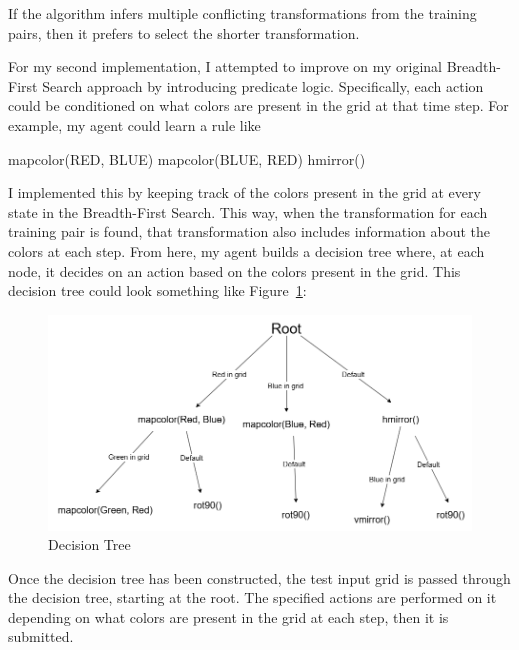 \documentclass[letterpaper]{article} %
\begin{document}
\bigskip

If the algorithm infers multiple conflicting transformations from the training pairs, then it prefers to select the shorter transformation.

\bigskip\bigskip

For my second implementation, I attempted to improve on my original Breadth-First Search approach by introducing predicate logic. Specifically, each action could be conditioned on what colors are present in the grid at that time step. For example, my agent could learn a rule like


\begin{algorithmic}
        \STATE mapcolor(RED, BLUE)
        \STATE mapcolor(BLUE, RED)
    \ELSE
        \STATE hmirror()
    \ENDIF
\end{algorithmic}

\bigskip

I implemented this by keeping track of the colors present in the grid at every state in the Breadth-First Search. This way, when the transformation for each training pair is found, that transformation also includes information about the colors at each step. From here, my agent builds a decision tree where, at each node, it decides on an action based on the colors present in the grid. This decision tree could look something like Figure~\ref{fig:tree}:

\begin{figure}[htbp]
    \centering
    \includegraphics[width=\hsize]{decision tree.drawio.png}
    \caption{Decision Tree}
    \label{fig:tree}
\end{figure}

Once the decision tree has been constructed, the test input grid is passed through the decision tree, starting at the root. The specified actions are performed on it depending on what colors are present in the grid at each step, then it is submitted.
\end{document}
